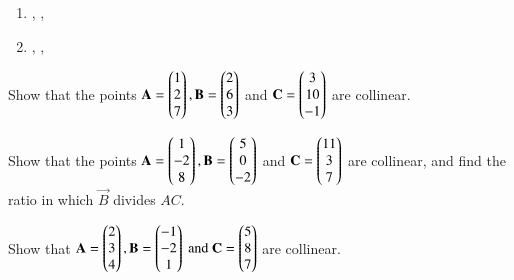 \begin{enumerate}
\item {},  ,   
\item {},  ,   
\end{enumerate}

\item Show that the points 
$\mathbf{A}=\begin{pmatrix}1\\2\\7\end{pmatrix}, \mathbf{B}=\begin{pmatrix}2\\6\\3\end{pmatrix}$ and $ \mathbf{C}=\begin{pmatrix}3\\10\\-1\end{pmatrix}$ are collinear.
\item Show that the points 
$\mathbf{A}=\begin{pmatrix}1\\-2\\8\end{pmatrix}, \mathbf{B}=\begin{pmatrix}5\\0\\-2\end{pmatrix}$ and $ \mathbf{C}=\begin{pmatrix}11\\3\\7\end{pmatrix}$ are collinear, and find the ratio in which $\vec{B}$ divides $AC$.
\item Show that 
$
\mathbf{A}=\begin{pmatrix}2\\3\\4\end{pmatrix}, 
\mathbf{B}=\begin{pmatrix}-1\\-2\\1\end{pmatrix} \text{ and } 
\mathbf{C}=\begin{pmatrix}5\\8\\7\end{pmatrix}$  
are collinear.

